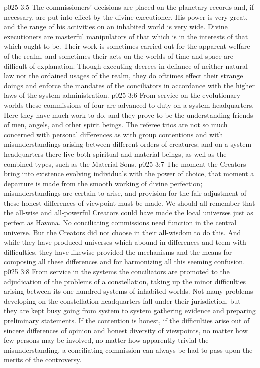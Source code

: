 \vs p025 3:5 The commissioners’ decisions are placed on the planetary records and, if necessary, are put into effect by the divine executioner. His power is very great, and the range of his activities on an inhabited world is very wide. Divine executioners are masterful manipulators of that which is in the interests of that which ought to be. Their work is sometimes carried out for the apparent welfare of the realm, and sometimes their acts on the worlds of time and space are difficult of explanation. Though executing decrees in defiance of neither natural law nor the ordained usages of the realm, they do ofttimes effect their strange doings and enforce the mandates of the conciliators in accordance with the higher laws of the system administration.
\pc \vs p025 3:6 \bibnobreakspace {} From service on the evolutionary worlds these commissions of four are advanced to duty on a system headquarters. Here they have much work to do, and they prove to be the understanding friends of men, angels, and other spirit beings. The referee trios are not so much concerned with personal differences as with group contentions and with misunderstandings arising between different orders of creatures; and on a system headquarters there live both spiritual and material beings, as well as the combined types, such as the Material Sons.
\vs p025 3:7 The moment the Creators bring into existence evolving individuals with the power of choice, that moment a departure is made from the smooth working of divine perfection; misunderstandings are certain to arise, and provision for the fair adjustment of these honest differences of viewpoint must be made. We should all remember that the all\hyp{}wise and all\hyp{}powerful Creators could have made the local universes just as perfect as Havona. No conciliating commissions need function in the central universe. But the Creators did not choose in their all\hyp{}wisdom to do this. And while they have produced universes which abound in differences and teem with difficulties, they have likewise provided the mechanisms and the means for composing all these differences and for harmonizing all this seeming confusion.
\pc \vs p025 3:8 \bibnobreakspace {} From service in the systems the conciliators are promoted to the adjudication of the problems of a constellation, taking up the minor difficulties arising between its one hundred systems of inhabited worlds. Not many problems developing on the constellation headquarters fall under their jurisdiction, but they are kept busy going from system to system gathering evidence and preparing preliminary statements. If the contention is honest, if the difficulties arise out of sincere differences of opinion and honest diversity of viewpoints, no matter how few persons may be involved, no matter how apparently trivial the misunderstanding, a conciliating commission can always be had to pass upon the merits of the controversy.
